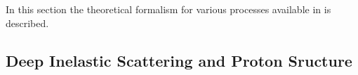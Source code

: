 

%
In this section the theoretical formalism for various processes available in \fitter is described.



\subsection{Deep Inelastic Scattering and Proton Sructure}
\label{dissection}


